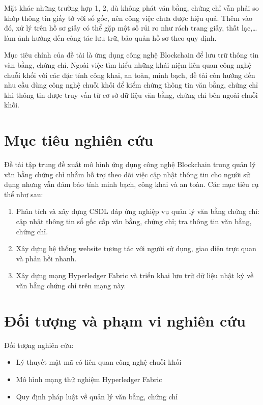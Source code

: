 Mặt khác những trường hợp 1, 2, dù không phát văn bằng, chứng chỉ vẫn phải so khớp thông tin giấy tờ với sổ gốc, nên công việc chưa được hiệu quả. Thêm vào đó, xử lý trên hồ sơ giấy có thể gặp một số rủi ro như rách trang giấy, thất lạc,\ldots{} làm ảnh hưởng đến công tác lưu trữ, bảo quản hồ sơ theo quy định.

Mục tiêu chính của đề tài là ứng dụng công nghệ Blockchain để lưu trữ thông tin văn bằng, chứng chỉ. Ngoài việc tìm hiểu những khái niệm liên quan công nghệ chuỗi khối với các đặc tính công khai, an toàn, minh bạch, đề tài còn hướng đến nhu cầu dùng công nghệ chuỗi khối để kiểm chứng thông tin văn bằng, chứng chỉ khi thông tin được truy vấn từ cơ sở dữ liệu văn bằng, chứng chỉ bên ngoài chuỗi khối.

\section{Mục tiêu nghiên cứu}

Đề tài tập trung đề xuất mô hình ứng dụng công nghệ Blockchain trong quản lý văn bằng chứng chỉ nhằm hỗ trợ theo dõi việc cập nhật thông tin cho người sử dụng nhưng vẫn đảm bảo tính minh bạch, công khai và an toàn. Các mục tiêu cụ thể như sau:

\begin{enumerate}
\item Phân tích và xây dựng CSDL đáp ứng nghiệp vụ quản lý văn bằng chứng chỉ: cập nhật thông tin sổ gốc cấp văn bằng, chứng chỉ; tra thông tin văn bằng, chứng chỉ.
\item Xây dựng hệ thống website tương tác với người sử dụng, giao diện trực quan và phản hồi nhanh.
\item Xây dựng mạng Hyperledger Fabric và triển khai lưu trữ dữ liệu nhật ký về văn bằng chứng chỉ trên mạng này.
\end{enumerate}

\section{Đối tượng và phạm vi nghiên cứu}

Đối tượng nghiên cứu:

\begin{itemize}
\item Lý thuyết mật mã có liên quan công nghệ chuỗi khối
\item Mô hình mạng thử nghiệm Hyperledger Fabric
\item Quy định pháp luật về quản lý văn bằng, chứng chỉ
\end{itemize}

